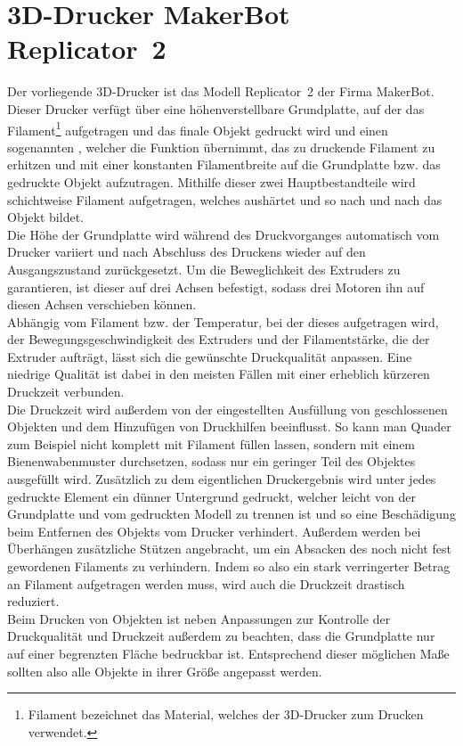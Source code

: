 \section{3D-Drucker MakerBot Replicator\texttrademark\ 2}
Der vorliegende 3D-Drucker ist das Modell Replicator\texttrademark\ 2 der Firma MakerBot.
Dieser Drucker verfügt über eine höhenverstellbare Grundplatte, auf der das Filament\footnote{Filament bezeichnet das Material, welches der 3D-Drucker zum Drucken verwendet.} aufgetragen und das finale Objekt gedruckt wird und einen sogenannten , welcher die Funktion übernimmt, das zu druckende Filament zu erhitzen und mit einer konstanten Filamentbreite auf die Grundplatte bzw. das gedruckte Objekt aufzutragen. 
Mithilfe dieser zwei Hauptbestandteile wird schichtweise Filament aufgetragen, welches aushärtet und so nach und nach das Objekt bildet. \\
Die Höhe der Grundplatte wird während des Druckvorganges automatisch vom Drucker variiert und nach Abschluss des Druckens wieder auf den Ausgangszustand zurückgesetzt.
Um die Beweglichkeit des Extruders zu garantieren, ist dieser auf drei Achsen befestigt, sodass drei Motoren ihn auf diesen Achsen verschieben können. \\
Abhängig vom Filament bzw. der Temperatur, bei der dieses aufgetragen wird, der Bewegungsgeschwindigkeit des Extruders und der Filamentstärke, die der Extruder aufträgt, lässt sich die gewünschte Druckqualität anpassen.
Eine niedrige Qualität ist dabei in den meisten Fällen mit einer erheblich kürzeren Druckzeit verbunden. \\
Die Druckzeit wird außerdem von der eingestellten Ausfüllung von geschlossenen Objekten und dem Hinzufügen von Druckhilfen beeinflusst.
So kann man Quader zum Beispiel nicht komplett mit Filament füllen lassen, sondern mit einem Bienenwabenmuster durchsetzen, sodass nur ein geringer Teil des Objektes ausgefüllt wird.
Zusätzlich zu dem eigentlichen Druckergebnis wird unter jedes gedruckte Element ein dünner Untergrund gedruckt, welcher leicht von der Grundplatte und vom gedruckten Modell zu trennen ist und so eine Beschädigung beim Entfernen des Objekts vom Drucker verhindert.
Außerdem werden bei Überhängen zusätzliche Stützen angebracht, um ein Absacken des noch nicht fest gewordenen Filaments zu verhindern. 
Indem so also ein stark verringerter Betrag an Filament aufgetragen werden muss, wird auch die Druckzeit drastisch reduziert. \\
Beim Drucken von Objekten ist neben Anpassungen zur Kontrolle der Druckqualität und Druckzeit außerdem zu beachten, dass die Grundplatte nur auf einer begrenzten Fläche bedruckbar ist.
Entsprechend dieser möglichen Maße sollten also alle Objekte in ihrer Größe angepasst werden.
